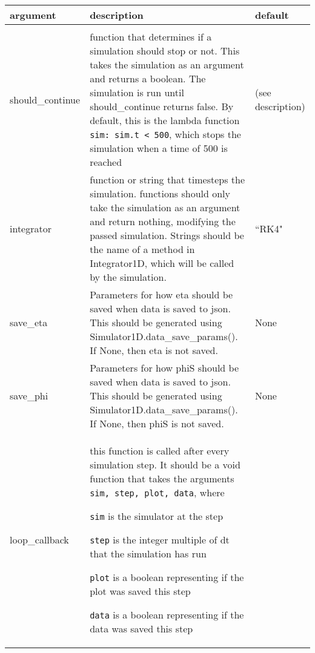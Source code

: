 \documentclass[10pt,a4paper]{article}
\newenvironment{optarglist}
    {\begin{center}
    \begin{tabular}{l|p{10cm}|l}
    argument & description & default\\
    \hline\\
    }
    { 
    \end{tabular} 
    \end{center}
    }
\begin{document}
\begin{optarglist}
should\_continue &
                   function that determines if a simulation should stop or
                    not. This takes the simulation as an argument and returns a
                    boolean. The simulation is run until should\_continue
                    returns false. By default, this is the lambda function
                    \texttt{sim: sim.t < 500}, which stops the simulation when a time of 500 is reached & (see description)\\\hline
integrator &
function or string that timesteps the simulation.
                    functions should only take the simulation as an argument
                    and return nothing, modifying the passed simulation.
                    Strings should be the name of a method in Integrator1D,
                    which will be called by the simulation. &
                    ``RK4" \\\hline

save\_eta &
                   Parameters for how eta should be saved when data is saved to json.
                    This should be generated using
                    Simulator1D.data\_save\_params(). If None, then eta is not
                    saved. & None\\\hline
        
        save\_phi &
                   Parameters for how phiS should be saved when data is saved to json.
                    This should be generated using
                    Simulator1D.data\_save\_params(). If None, then phiS is not
                    saved. & None\\\hline

        loop\_callback &
                   this function is called after every simulation step. It
                    should be a void function that takes the arguments
                    \texttt{sim, step, plot, data}, where

                    \texttt{sim} is the simulator at the step

                    \texttt{step} is the integer multiple of dt that the simulation
                    has run

                    \texttt{plot} is a boolean representing if the plot was saved this
                    step

                    \texttt{data} is a boolean representing if the data was saved this
                    step
                    

\end{optarglist}
\end{document}
